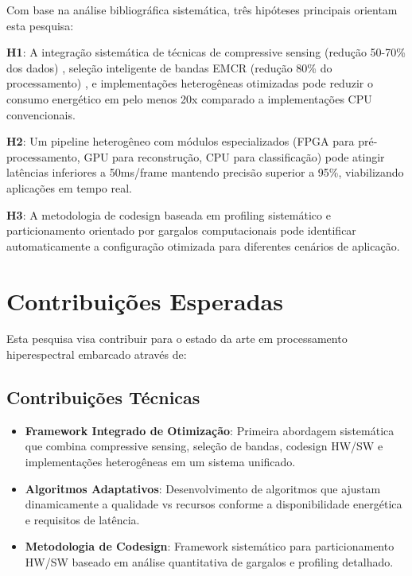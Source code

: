 Com base na análise bibliográfica sistemática, três hipóteses principais orientam esta pesquisa:

\textbf{H1}: A integração sistemática de técnicas de compressive sensing (redução 50-70\% dos dados) \cite{lim2022}, seleção inteligente de bandas EMCR (redução 80\% do processamento) \cite{martins2019}, e implementações heterogêneas otimizadas pode reduzir o consumo energético em pelo menos 20x comparado a implementações CPU convencionais.

\textbf{H2}: Um pipeline heterogêneo com módulos especializados (FPGA para pré-processamento, GPU para reconstrução, CPU para classificação) pode atingir latências inferiores a 50ms/frame mantendo precisão superior a 95\%, viabilizando aplicações em tempo real.

\textbf{H3}: A metodologia de codesign baseada em profiling sistemático e particionamento orientado por gargalos computacionais pode identificar automaticamente a configuração otimizada para diferentes cenários de aplicação.

\section{Contribuições Esperadas}

Esta pesquisa visa contribuir para o estado da arte em processamento hiperespectral embarcado através de:

\subsection{Contribuições Técnicas}

\begin{itemize}
\item \textbf{Framework Integrado de Otimização}: Primeira abordagem sistemática que combina compressive sensing, seleção de bandas, codesign HW/SW e implementações heterogêneas em um sistema unificado.

\item \textbf{Algoritmos Adaptativos}: Desenvolvimento de algoritmos que ajustam dinamicamente a qualidade vs recursos conforme a disponibilidade energética e requisitos de latência.

\item \textbf{Metodologia de Codesign}: Framework sistemático para particionamento HW/SW baseado em análise quantitativa de gargalos e profiling detalhado.
\end{itemize}


